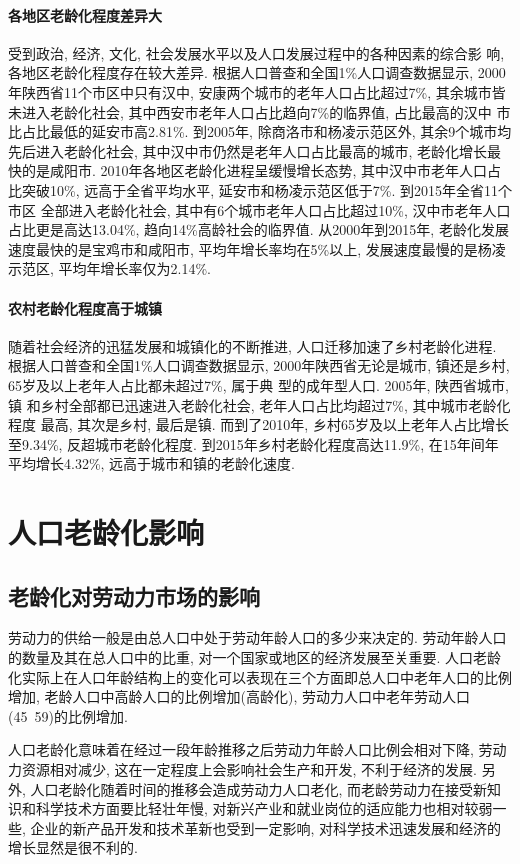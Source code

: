 \documentclass[a4paper, 12pt, UTF8]{article}
\begin{document}
\paragraph{各地区老龄化程度差异大}
受到政治, 经济, 文化, 社会发展水平以及人口发展过程中的各种因素的综合影 响, 各地区老龄化程度存在较大差异. 根据人口普查和全国1\%人口调查数据显示, 2000年陕西省11个市区中只有汉中, 安康两个城市的老年人口占比超过7\%, 其余城市皆未进入老龄化社会, 其中西安市老年人口占比趋向7\%的临界值, 占比最高的汉中 市比占比最低的延安市高2.81\%. 到2005年, 除商洛市和杨凌示范区外, 其余9个城市均先后进入老龄化社会, 其中汉中市仍然是老年人口占比最高的城市, 老龄化增长最快的是咸阳市. 2010年各地区老龄化进程呈缓慢增长态势, 其中汉中市老年人口占比突破10\%, 远高于全省平均水平, 延安市和杨凌示范区低于7\%. 到2015年全省11个市区 全部进入老龄化社会, 其中有6个城市老年人口占比超过10\%, 汉中市老年人口占比更是高达13.04\%, 趋向14\%高龄社会的临界值. 从2000年到2015年, 老龄化发展速度最快的是宝鸡市和咸阳市, 平均年增长率均在5\%以上, 发展速度最慢的是杨凌示范区, 平均年增长率仅为2.14\%.  

\paragraph{农村老龄化程度高于城镇}
随着社会经济的迅猛发展和城镇化的不断推进, 人口迁移加速了乡村老龄化进程. 根据人口普查和全国1\%人口调查数据显示, 2000年陕西省无论是城市, 镇还是乡村, 65岁及以上老年人占比都未超过7\%, 属于典 型的成年型人口. 2005年, 陕西省城市, 镇 和乡村全部都已迅速进入老龄化社会, 老年人口占比均超过7\%, 其中城市老龄化程度 最高, 其次是乡村, 最后是镇. 而到了2010年, 乡村65岁及以上老年人占比增长至9.34\%, 反超城市老龄化程度. 到2015年乡村老龄化程度高达11.9\%, 在15年间年平均增长4.32\%, 远高于城市和镇的老龄化速度.

\section{人口老龄化影响}
\subsection{老龄化对劳动力市场的影响}

劳动力的供给一般是由总人口中处于劳动年龄人口的多少来决定的. 劳动年龄人口的数量及其在总人口中的比重, 对一个国家或地区的经济发展至关重要. 人口老龄化实际上在人口年龄结构上的变化可以表现在三个方面即总人口中老年人口的比例增加, 老龄人口中高龄人口的比例增加(高龄化), 劳动力人口中老年劳动人口(45~59)的比例增加. 

人口老龄化意味着在经过一段年龄推移之后劳动力年龄人口比例会相对下降, 劳动力资源相对减少, 这在一定程度上会影响社会生产和开发, 不利于经济的发展. 另外, 人口老龄化随着时间的推移会造成劳动力人口老化, 而老龄劳动力在接受新知识和科学技术方面要比轻壮年慢, 对新兴产业和就业岗位的适应能力也相对较弱一些, 企业的新产品开发和技术革新也受到一定影响, 对科学技术迅速发展和经济的增长显然是很不利的. 
\end{document}
